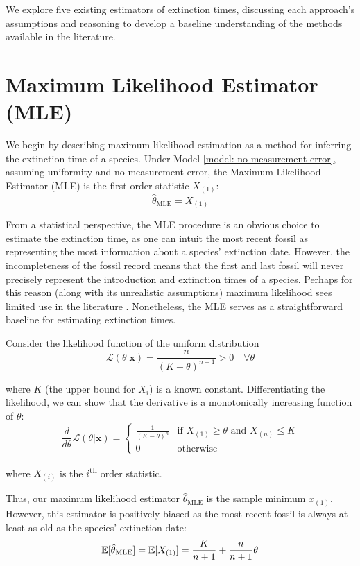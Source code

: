 
We explore five existing estimators of extinction times, discussing each approach's assumptions and reasoning to develop a baseline understanding of the methods available in the literature.

\section{Maximum Likelihood Estimator (MLE)}

We begin by describing maximum likelihood estimation as a method for inferring the extinction time of a species. Under Model \ref{model: no-measurement-error}, assuming uniformity and no measurement error, the Maximum Likelihood Estimator (MLE) is the first order statistic $X_{(1)}$:
\begin{equation}\label{eq:mle}
    \hat\theta_{\text{MLE}} = X_{(1)}
\end{equation}

From a statistical perspective, the MLE procedure is an obvious choice to estimate the extinction time, as one can intuit the most recent fossil as representing the most information about a species' extinction date. However, the incompleteness of the fossil record means that the first and last fossil will never precisely represent the introduction and extinction times of a species. Perhaps for this reason (along with its unrealistic assumptions) maximum likelihood sees limited use in the literature \cite{Ludwig1996, Jaric2016}. Nonetheless, the MLE serves as a straightforward baseline for estimating extinction times.

Consider the likelihood function of the uniform distribution
\[
\mathcal{L}(\theta | \bm{x}) =  \frac{n}{(K - \theta)^{n+1}} > 0 \quad \forall \theta
\]

where $K$ (the upper bound for $X_i$) is a known constant. Differentiating the likelihood, we can show that the derivative is a monotonically increasing function of $\theta$:
\[
\frac{d}{d\theta}\mathcal{L}(\theta | \bm{x} ) = \begin{cases}
    \frac{1}{(K-\theta)^n} & \text{if $X_{(1)} \geq \theta$ and $X_{(n)} \leq K$} \\
    0 & \text{otherwise}
\end{cases}
\]

where $X_{(i)}$ is the $i$\textsuperscript{th} order statistic.

Thus, our maximum likelihood estimator $\hat\theta_{\text{MLE}}$ is the sample minimum $x_{(1)}$. However, this estimator is positively biased as the most recent fossil is always at least as old as the species' extinction date:
\[
    \mathbb{E}[\hat\theta_{\text{MLE}}] = \mathbb{E}[X_{(1)}] = \frac{K}{n+1} + \frac{n}{n+1}\theta
\]

